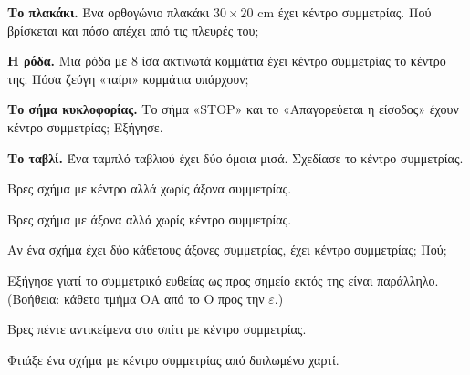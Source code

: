 \ex \textbf{Το πλακάκι.} Ένα ορθογώνιο πλακάκι $30\times20$ cm έχει κέντρο συμμετρίας. Πού βρίσκεται και πόσο απέχει από τις πλευρές του;

\ex \textbf{Η ρόδα.} Μια ρόδα με $8$ ίσα ακτινωτά κομμάτια έχει κέντρο συμμετρίας το κέντρο της. Πόσα ζεύγη «ταίρι» κομμάτια υπάρχουν;

\ex \textbf{Το σήμα κυκλοφορίας.} Το σήμα «STOP» και το «Απαγορεύεται η είσοδος» έχουν κέντρο συμμετρίας; Εξήγησε.

\ex \textbf{Το ταβλί.} Ένα ταμπλό ταβλιού έχει δύο όμοια μισά. Σχεδίασε το κέντρο συμμετρίας.


\ex Βρες σχήμα με κέντρο αλλά χωρίς άξονα συμμετρίας.

\ex Βρες σχήμα με άξονα αλλά χωρίς κέντρο συμμετρίας.

\ex Αν ένα σχήμα έχει δύο κάθετους άξονες συμμετρίας, έχει κέντρο συμμετρίας; Πού;

\ex Εξήγησε γιατί το συμμετρικό ευθείας ως προς σημείο εκτός της είναι παράλληλο. (Βοήθεια: κάθετο τμήμα $\mathrm{ΟΑ}$ από το $\mathrm{Ο}$ προς την $\varepsilon$.)


\ex Βρες πέντε αντικείμενα στο σπίτι με κέντρο συμμετρίας.

\ex Φτιάξε ένα σχήμα με κέντρο συμμετρίας από διπλωμένο χαρτί.

